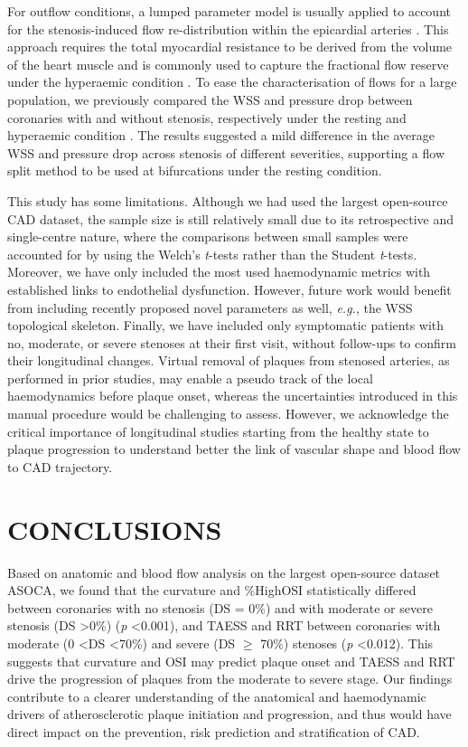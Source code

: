 \documentclass[preprint,11pt,review]{elsarticle}
\begin{document}
For outflow conditions, a lumped parameter model is usually applied to account for the stenosis-induced flow re-distribution within the epicardial arteries \cite{Taylor2013Computational}. This approach requires the total myocardial resistance to be derived from the volume of the heart muscle and is commonly used to capture the fractional flow reserve under the hyperaemic condition \cite{Kim2010Patient-Specific}. To ease the characterisation of flows for a large population, we previously compared the WSS and pressure drop between coronaries with and without stenosis, respectively under the resting and hyperaemic condition \cite{Zhang2022Comparison}. The results suggested a mild difference in the average WSS and pressure drop across stenosis of different severities, supporting a flow split method to be used at bifurcations under the resting condition.

This study has some limitations. Although we had used the largest open-source CAD dataset, the sample size is still relatively small due to its retrospective and single-centre nature, where the comparisons between small samples were accounted for by using the Welch's \textit{t}-tests rather than the Student \textit{t}-tests. Moreover, we have only included the most used haemodynamic metrics with established links to endothelial dysfunction. However, future work would benefit from including recently proposed novel parameters as well, \textit{e.g.}, the WSS topological skeleton. Finally, we have included only symptomatic patients with no, moderate, or severe stenoses at their first visit, without follow-ups to confirm their longitudinal changes. Virtual removal of plaques from stenosed arteries, as performed in prior studies\cite{Knight2010Choosing, Rikhtegar2012Choosing}, may enable a pseudo track of the local haemodynamics before plaque onset, whereas the uncertainties introduced in this manual procedure would be challenging to assess. However, we acknowledge the critical importance of longitudinal studies starting from the healthy state to plaque progression to understand better the link of vascular shape and blood flow to CAD trajectory.

\section{CONCLUSIONS}

Based on anatomic and blood flow analysis on the largest open-source dataset ASOCA, we found that the curvature and \%HighOSI statistically differed between coronaries with no stenosis (DS = 0\%) and with moderate or severe stenosis (DS \textgreater 0\%) (\textit{p} \textless 0.001), and TAESS and RRT between coronaries with moderate (0 \textless DS \textless 70\%) and severe (DS $\geq$ 70\%) stenoses (\textit{p} \textless 0.012). This suggests that curvature and OSI may predict plaque onset and  TAESS and RRT drive the progression of plaques from the moderate to severe stage. Our findings contribute to a clearer understanding of the anatomical and haemodynamic drivers of atherosclerotic plaque initiation and progression, and thus would have direct impact on the prevention, risk prediction and stratification of CAD. 
\end{document}
